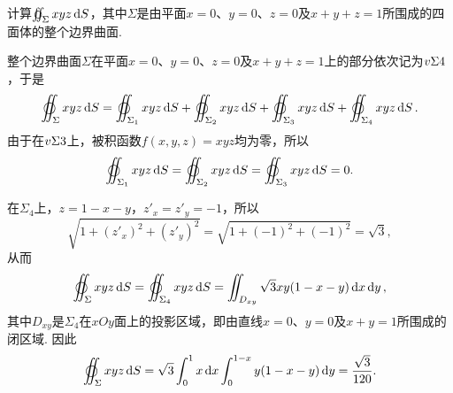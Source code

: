 \begin{example}
计算\(\varoiint_{\Sigma} xyz \dd{S}\)，其中\(\Sigma\)是由平面\(x=0\)、\(y=0\)、\(z=0\)及\(x+y+z=1\)所围成的四面体的整个边界曲面.
\begin{solution}
整个边界曲面\(\Sigma\)在平面\(x=0\)、\(y=0\)、\(z=0\)及\(x+y+z=1\)上的部分依次记为\(v{\Sigma}{4}\)，于是\[
\varoiint_{\Sigma} xyz \dd{S}
= \varoiint_{\Sigma_1} xyz \dd{S}
+ \varoiint_{\Sigma_2} xyz \dd{S}
+ \varoiint_{\Sigma_3} xyz \dd{S}
+ \varoiint_{\Sigma_4} xyz \dd{S}.
\]
由于在\(v{\Sigma}{3}\)上，被积函数\(f(x,y,z)=xyz\)均为零，所以\[
\varoiint_{\Sigma_1} xyz \dd{S}
= \varoiint_{\Sigma_2} xyz \dd{S}
= \varoiint_{\Sigma_3} xyz \dd{S}
= 0.
\]

在\(\Sigma_4\)上，\(z=1-x-y\)，\(z'_x = z'_y = -1\)，所以\[
\sqrt{1+(z'_x)^2+(z'_y)^2}
= \sqrt{1+(-1)^2+(-1)^2}
= \sqrt{3},
\]从而\[
\varoiint_{\Sigma} xyz \dd{S}
= \varoiint_{\Sigma_4} xyz \dd{S}
= \iint_{D_{xy}} \sqrt{3} xy (1-x-y) \dd{x} \dd{y},
\]其中\(D_{xy}\)是\(\Sigma_4\)在\(xOy\)面上的投影区域，即由直线\(x=0\)、\(y=0\)及\(x+y=1\)所围成的闭区域.
因此\[
\varoiint_{\Sigma} xyz \dd{S}
= \sqrt{3} \int_0^1 x \dd{x} \int_0^{1-x} y (1-x-y) \dd{y}
= \frac{\sqrt{3}}{120}.
\]
\end{solution}
\end{example}

